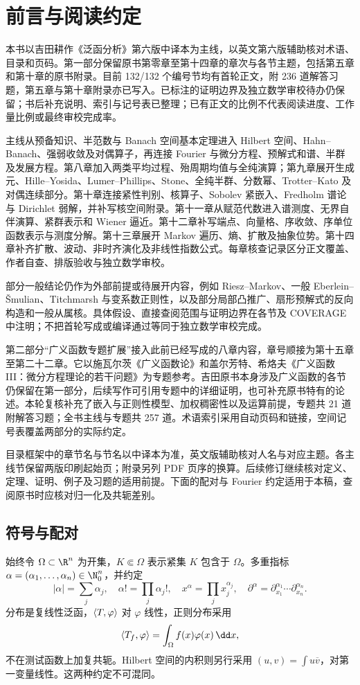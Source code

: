 \chapter*{前言与阅读约定}
本书以吉田耕作《泛函分析》第六版中译本为主线，以英文第六版辅助核对术语、目录和页码。第一部分保留原书第零章至第十四章的章次与各节主题，包括第五章和第十章的原书附录。目前 132/132 个编号节均有首轮正文，附 236 道解答习题，第五章与第十章附录亦已写入。已标注的证明边界及独立数学审校待办仍保留；书后补充说明、索引与记号表已整理；已有正文的比例不代表阅读进度、工作量比例或最终审校完成率。

主线从预备知识、半范数与 Banach 空间基本定理进入 Hilbert 空间、Hahn--Banach、强弱收敛及对偶算子，再连接 Fourier 与微分方程、预解式和谱、半群及发展方程。第八章加入两类平均过程、殆周期均值与全纯演算；第九章展开生成元、Hille--Yosida、Lumer--Phillips、Stone、全纯半群、分数幂、Trotter--Kato 及对偶连续部分。第十章连接紧性判别、核算子、Sobolev 紧嵌入、Fredholm 谱论与 Dirichlet 弱解，并补写核空间附录。第十一章从赋范代数进入谱测度、无界自伴演算、紧群表示和 Wiener 逼近。第十二章补写端点、向量格、序收敛、序单位函数表示与测度分解。第十三章展开 Markov 遍历、熵、扩散及抽象位势。第十四章补齐扩散、波动、非时齐演化及非线性指数公式。每章核查记录区分正文覆盖、作者自查、排版验收与独立数学审校。

部分一般结论仍作为外部前提或待展开内容，例如 Riesz--Markov、一般 Eberlein--\v Smulian、Titchmarsh 与变系数正则性，以及部分局部凸推广、扇形预解式的反向构造和一般从属核。具体假设、直接查阅范围与证明边界在各节及 COVERAGE 中注明；不把首轮写成或编译通过等同于独立数学审校完成。

第二部分“广义函数专题扩展”接入此前已经写成的八章内容，章号顺接为第十五章至第二十二章。它以施瓦尔茨《广义函数论》和盖尔芳特、希烙夫《广义函数 III：微分方程理论的若干问题》为专题参考。吉田原书本身涉及广义函数的各节仍保留在第一部分，后续写作可引用专题中的详细证明，也可补充原书特有的论述。本轮复核补充了嵌入与正则性模型、加权稠密性以及运算前提，专题共 21 道附解答习题；全书主线与专题共 257 道。术语索引采用自动页码和链接，空间记号表覆盖两部分的实际约定。

目录框架中的章节名与节名以中译本为准，英文版辅助核对人名与对应主题。各主线节保留两版印刷起始页；附录另列 PDF 页序的换算。后续修订继续核对定义、定理、证明、例子及习题的适用前提。下面的配对与 Fourier 约定适用于本稿，查阅原书时应核对归一化及共轭差别。

\section*{符号与配对}
{}
始终令 $\Omega\subset\R^n$ 为开集，$K\Subset\Omega$ 表示紧集 $K$ 包含于 $\Omega$。多重指标 $\alpha=(\alpha_1,\ldots,\alpha_n)\in\N_0^n$，并约定
\[
 |\alpha|=\sum_j\alpha_j,\quad \alpha!=\prod_j\alpha_j!,\quad
 x^\alpha=\prod_jx_j^{\alpha_j},\quad
 \partial^\alpha=\partial_{x_1}^{\alpha_1}\cdots\partial_{x_n}^{\alpha_n}.
\]
分布是复线性泛函，$\langle T,\varphi\rangle$ 对 $\varphi$ 线性，正则分布采用
\[
 \Pair{T_f}{\varphi}=\int_\Omega f(x)\varphi(x)\,\dd x,
\]
不在测试函数上加复共轭。Hilbert 空间的内积则另行采用 $ (u,v)=\int u\overline v$，对第一变量线性。这两种约定不可混同。

